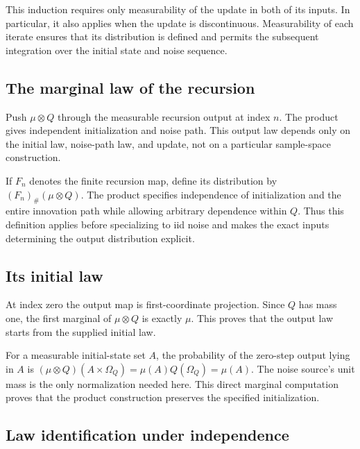 \documentclass[11pt,a4paper]{article}
\begin{document}
This induction requires only measurability of the update in both of its inputs. In particular, it also applies when the update is discontinuous. Measurability of each iterate ensures that its distribution is defined and permits the subsequent integration over the initial state and noise sequence.


\subsection{\texorpdfstring{The marginal law of the recursion}{The marginal law of the recursion}}


Push \(\mu\otimes Q\) through the measurable recursion output at index \(n\). The product gives independent initialization and noise path. This output law depends only on the initial law, noise-path law, and update, not on a particular sample-space construction.



If \(F_n\) denotes the finite recursion map, define its distribution by \((F_n)_\#(\mu\otimes Q)\). The product specifies independence of initialization and the entire innovation path while allowing arbitrary dependence within \(Q\). Thus this definition applies before specializing to iid noise and makes the exact inputs determining the output distribution explicit.


\subsection{\texorpdfstring{Its initial law}{Its initial law}}


At index zero the output map is first-coordinate projection. Since \(Q\) has mass one, the first marginal of \(\mu\otimes Q\) is exactly \(\mu\). This proves that the output law starts from the supplied initial law.



For a measurable initial-state set \(A\), the probability of the zero-step output lying in \(A\) is \((\mu\otimes Q)(A\times\Omega_Q)=\mu(A)Q(\Omega_Q)=\mu(A)\). The noise source's unit mass is the only normalization needed here. This direct marginal computation proves that the product construction preserves the specified initialization.


\subsection{\texorpdfstring{Law identification under independence}{Law identification under independence}}
\end{document}
